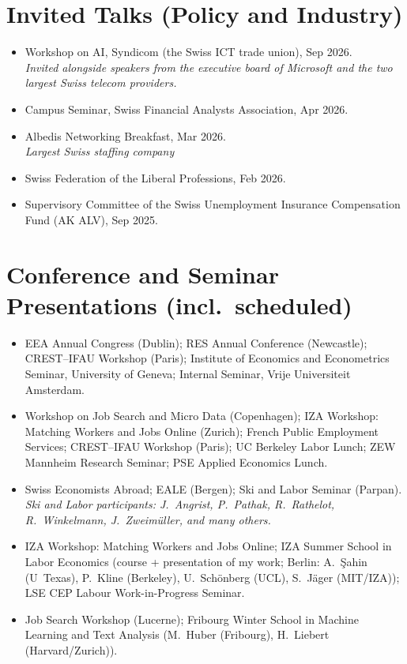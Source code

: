 \documentclass[11pt]{article}
\newenvironment{yearlist}%
  {\begin{itemize}[leftmargin=4.2em, labelsep=1.4em, itemsep=3pt]}%
  {\end{itemize}}
\begin{document}
\section{Invited Talks (Policy and Industry)}
\begin{itemize}
\item Workshop on AI, Syndicom (the Swiss ICT trade union), Sep 2026.\\
  \textit{Invited alongside speakers from the executive board of Microsoft and the two largest Swiss telecom providers.}
\item Campus Seminar, Swiss Financial Analysts Association, Apr 2026.
\item Albedis Networking Breakfast, Mar 2026.\\\textit{Largest Swiss staffing company}
\item Swiss Federation of the Liberal Professions, Feb 2026.
\item Supervisory Committee of the Swiss Unemployment Insurance Compensation Fund (AK ALV), Sep 2025.
\end{itemize}

\section{Conference and Seminar Presentations (incl.\ scheduled)}
\begin{yearlist}
\item[2026] EEA Annual Congress (Dublin); RES Annual Conference (Newcastle); CREST--IFAU Workshop (Paris); Institute of Economics and Econometrics Seminar, University of Geneva; Internal Seminar, Vrije Universiteit Amsterdam.
\item[2025] Workshop on Job Search and Micro Data (Copenhagen); IZA Workshop: Matching Workers and Jobs Online (Zurich); French Public Employment Services; CREST--IFAU Workshop (Paris); UC Berkeley Labor Lunch; ZEW Mannheim Research Seminar; PSE Applied Economics Lunch.
\item[2024] Swiss Economists Abroad; EALE (Bergen); Ski and Labor Seminar (Parpan).\\
  \textit{Ski and Labor participants: J.~Angrist, P.~Pathak, R.~Rathelot, R.~Winkelmann, J.~Zweim\"uller, and many others.}
\item[2023] IZA Workshop: Matching Workers and Jobs Online; IZA Summer School in Labor Economics (course + presentation of my work; Berlin: A.~\c{S}ahin (U~Texas), P.~Kline (Berkeley), U.~Sch\"onberg (UCL), S.~J\"ager (MIT/IZA)); LSE CEP Labour Work-in-Progress Seminar.
\item[2022] Job Search Workshop (Lucerne); Fribourg Winter School in Machine Learning and Text Analysis (M.~Huber (Fribourg), H.~Liebert (Harvard/Zurich)).
\end{yearlist}
\end{document}
